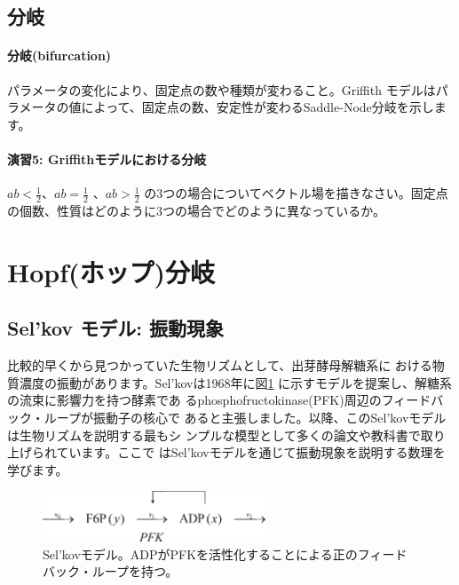 \subsection{分岐}
\paragraph{分岐(bifurcation)} パラメータの変化により、固定点の数や種類が変わること。Griffith モデルはパラメータの値によって、固定点の数、安定性が変わるSaddle-Node分岐を示します。

\paragraph{演習5:  Griffithモデルにおける分岐}
\(ab < \displaystyle\frac{1}{2}\)、\(ab=\displaystyle\frac{1}{2}\) 、\(ab > \displaystyle\frac{1}{2}\) の3つの場合についてベクトル場を描きなさい。固定点の個数、性質はどのように3つの場合でどのように異なっているか。


\section{Hopf(ホップ)分岐}

\def\演習問題#1{{\flushleft\underline{\bf 演習問題~#1}}}

%
\subsection{Sel'kov モデル: 振動現象}
\indent 比較的早くから見つかっていた生物リズムとして、出芽酵母解糖系に
おける物質濃度の振動があります。Sel'kovは1968年に図\ref{fig:09sysbio}
に示すモデルを提案し、解糖系の流束に影響力を持つ酵素であ
るphosphofructokinase(PFK)周辺のフィードバック・ループが振動子の核心で
あると主張しました。以降、このSel'kovモデルは生物リズムを説明する最もシ
ンプルな模型として多くの論文や教科書で取り上げられています。ここで
はSel'kovモデルを通じて振動現象を説明する数理を学びます。

\begin{figure}[ht]
        \centering \includegraphics[height=1.5cm]{../Bifurcation/img/selkov_model.eps}
        \caption{Sel'kovモデル。ADPがPFKを活性化することによる正のフィードバック・ループを持つ。}
        \label{fig:09sysbio} \end{figure}

